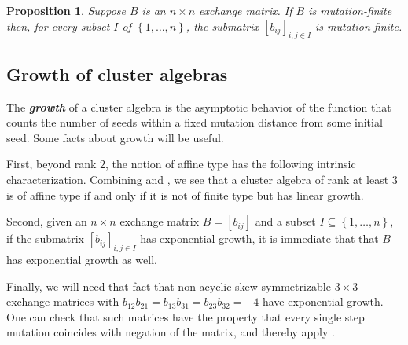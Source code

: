 \documentclass{amsart}
\newtheorem{proposition}{Proposition}[section]
\theoremstyle{definition}
\theoremstyle{remark}
\numberwithin{equation}{section}
\newcommand{\newword}[1]{\textbf{\emph{#1}}}
\newcommand{\set}[1]{{\left\lbrace #1 \right\rbrace}}
\newcommand{\0}{{\mathbf{0}}}
\newcommand{\kk}{\mathbf{k}}
\begin{document}
\begin{proposition}\label{mut fin sub}
Suppose $B$ is an $n\times n$ exchange matrix.
If $B$ is mutation-finite then, for every subset $I$ of $\set{1,\ldots,n}$, the submatrix $[b_{ij}]_{i,j\in I}$ is mutation-finite.
\end{proposition}

\subsection{Growth of cluster algebras}\label{growth sec}
The \newword{growth} of a cluster algebra is the asymptotic behavior of the function that counts the number of seeds within a fixed mutation distance from some initial seed.
Some facts about growth will be useful.

First, beyond rank $2$, the notion of affine type has the following intrinsic characterization.
Combining \cite[Theorem~3.5]{Seven} and \cite[Theorem~1.1]{FeShThTu12}, we see that a cluster algebra of rank at least $3$ is of affine type if and only if it is not of finite type but has linear growth.

Second, given an $n\times n$ exchange matrix $B=[b_{ij}]$ and a subset $I\subseteq\set{1,\ldots,n}$, if the submatrix $[b_{ij}]_{i,j\in I}$ has exponential growth, it is immediate that that $B$ has exponential growth as well.

Finally, we will need that fact that non-acyclic skew-symmetrizable $3\times3$ exchange matrices with $b_{12}b_{21}=b_{13}b_{31}=b_{23}b_{32}=-4$ have exponential growth.
One can check that such matrices have the property that every single step mutation coincides with negation of the matrix, and thereby apply \cite[Theorem~1.1]{FeShThTu12}.
\end{document}
